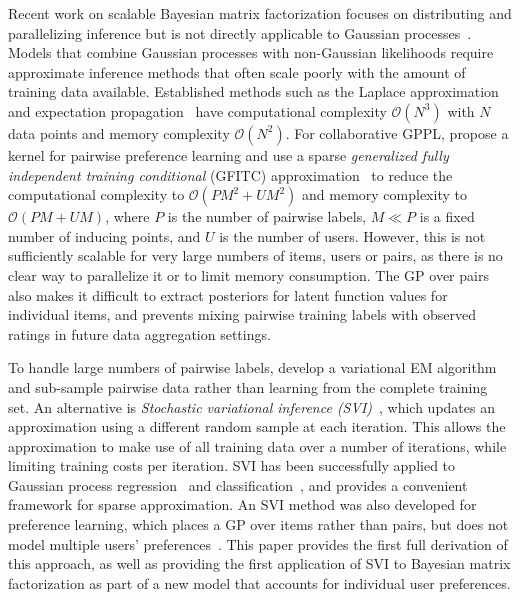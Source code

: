 Recent work on scalable Bayesian matrix factorization focuses on distributing and parallelizing 
 inference %
 but is not directly applicable to Gaussian processes~\citep{ahn2015large,vander2017distributed,chen2018large}. 
Models that combine Gaussian processes with non-Gaussian likelihoods 
require approximate inference methods that often scale poorly with 
the amount of training data available. 
Established methods such as the Laplace approximation 
and expectation propagation~\citep{rasmussen_gaussian_2006} have
computational complexity $\mathcal{O}(N^3)$ with $N$ data points
 and memory complexity $\mathcal{O}(N^2)$. 
For collaborative GPPL, \citet{houlsby2012collaborative}
propose a  kernel for pairwise 
preference learning and use a sparse
\emph{generalized fully independent training conditional} (GFITC) 
approximation~\citep{snelson2006sparse} to reduce the computational complexity to $\mathcal{O}(PM^2 + UM^2)$ and 
memory complexity to $\mathcal{O}(PM + UM)$,
where $P$ is the number of pairwise labels, $M \ll P$ is a fixed number of inducing points, and $U$ is the number of users.
However, this is not sufficiently scalable
 for very large numbers of items, users or pairs, as there is no clear way to parallelize it or to limit memory consumption.
The GP over pairs also makes it difficult to extract posteriors for latent function values for individual items,
and prevents mixing pairwise training labels
with observed ratings in future data aggregation settings.

To handle large numbers of pairwise labels, \citet{khan2014scalable}
develop a variational EM algorithm and sub-sample pairwise data rather than learning from the complete training set.
An alternative is \emph{Stochastic variational inference (SVI)}~\citep{hoffman2013stochastic}, which updates an approximation using 
 a different random sample at each iteration. 
 This allows the approximation to make use of all training data over a number of 
 iterations, while limiting training costs per iteration.
SVI has been successfully applied to Gaussian process regression~\citep{hensman2013gaussian} and classification~\citep{hensman2015scalable},
and provides a convenient framework for sparse approximation.
 An SVI method was also developed for preference learning,
 which places a GP over items rather than pairs, but does not model multiple users' preferences~\citep{simpson2018finding}.
This paper provides the first full derivation of this approach, %
as well as providing the first application of SVI to Bayesian matrix factorization
as part of a new model that accounts for individual user preferences.
